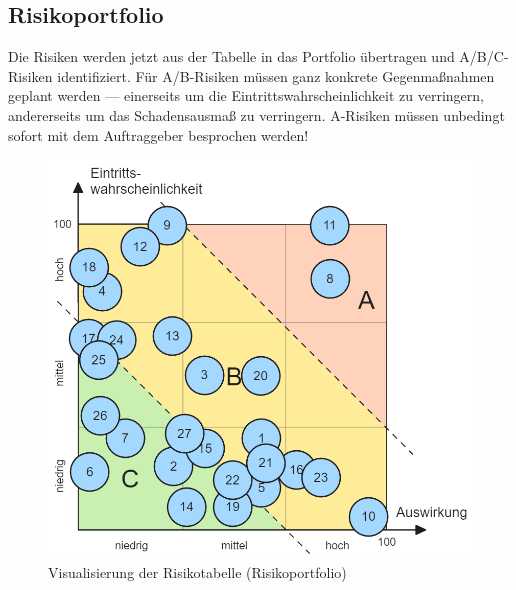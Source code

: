 \documentclass[
	headings=optiontotocandhead,%
	oneside,
	numbers=noenddot,%
	toc=flat, %
	10pt, %
	parskip=full, %
	listof=totoc, %
	listof=flat, %
	numbers=noenddot, %
	bibliography=totoc, %
	a4paper,DIV=14,
]{scrartcl}
\begin{document}
\subsection{Risikoportfolio}
Die Risiken werden jetzt aus der Tabelle in das Portfolio übertragen und A/B/C-Risiken identifiziert. Für A/B-Risiken müssen ganz konkrete Gegenmaßnahmen geplant werden — einerseits um die Eintrittswahrscheinlichkeit zu verringern, andererseits um das Schadensausmaß zu verringern. A-Risiken müssen unbedingt sofort mit dem Auftraggeber besprochen werden!
\begin{figure}[h]
	\centering
	\includegraphics[width=1\linewidth]{risikoportfolio}
	\caption[]{Visualisierung der Risikotabelle (Risikoportfolio)}
\end{figure}
\end{document}
